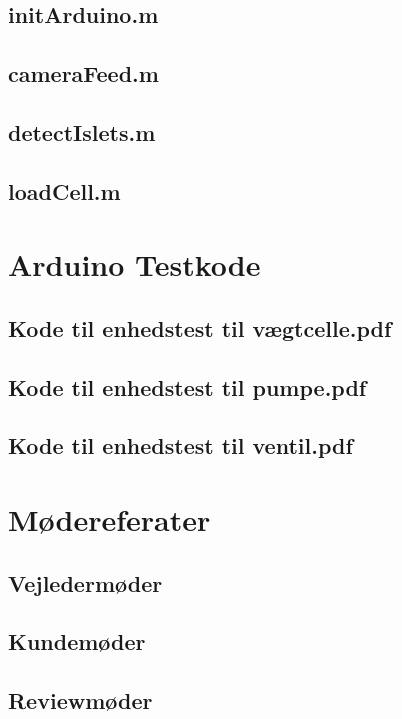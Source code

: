 \subsection{initArduino.m} 
\label{bilag:initArduino}
\subsection{cameraFeed.m} 
\label{bilag:cameraFeed}
\subsection{detectIslets.m}
\subsection{loadCell.m}
\section{Arduino Testkode}

\subsection{Kode til enhedstest til vægtcelle.pdf} 
\label{bilag:TKloadcell}

\subsection{Kode til enhedstest til pumpe.pdf}
\label{bilag:TKpumpe}

\subsection{Kode til enhedstest til ventil.pdf}
\label{bilag:TKventil}

\section{Mødereferater}
\label{mode}

\subsection{Vejledermøder}
\label{modevejleder}

\subsection{Kundemøder}
\label{modekunde}

\subsection{Reviewmøder}
\label{moderefreview}

